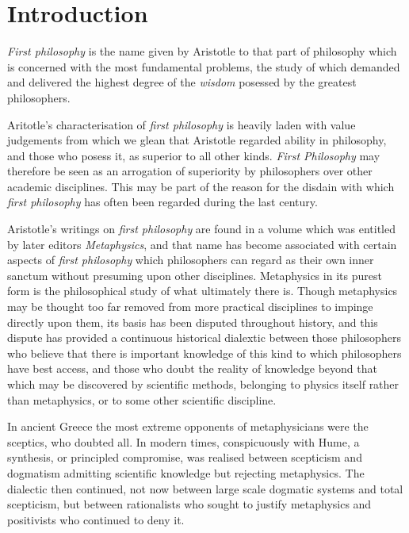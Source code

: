 \section{Introduction}\label{Introduction}

{\it First philosophy} is the name given by Aristotle to that part of philosophy which is concerned with the most fundamental problems, the study of which demanded and delivered the highest degree of the {\it wisdom} posessed by the greatest philosophers.

Aritotle's characterisation of {\it first philosophy} is heavily laden with value judgements from which we glean that Aristotle regarded ability in philosophy, and those who posess it, as superior to all other kinds.
{\it First Philosophy} may therefore be seen as an arrogation of superiority by philosophers over other academic disciplines.
This may be part of the reason for the disdain with which {\it first philosophy} has often been regarded during the last century.

Aristotle's writings on {\it first philosophy} are found in a volume which was entitled by later editors {\it Metaphysics}, and that name has become associated with certain aspects of {\it first philosophy} which philosophers can regard as their own inner sanctum without presuming upon other disciplines.
Metaphysics in its purest form is the philosophical study of what ultimately there is.
Though metaphysics may be thought too far removed from more practical disciplines to impinge directly upon them, its basis has been disputed throughout history, and this dispute has provided a continuous historical dialextic between those philosophers who believe that there is important knowledge of this kind to which philosophers have best access, and those who doubt the reality of knowledge beyond that which may be discovered by scientific methods, belonging to physics itself rather than metaphysics, or to some other scientific discipline.

In ancient Greece the most extreme opponents of metaphysicians were the sceptics, who doubted all.
In modern times, conspicuously with Hume, a synthesis, or principled compromise, was realised between scepticism and dogmatism admitting scientific knowledge but rejecting metaphysics.
The dialectic then continued, not now between large scale dogmatic systems and total scepticism, but between rationalists who sought to justify metaphysics and positivists who continued to deny it.

